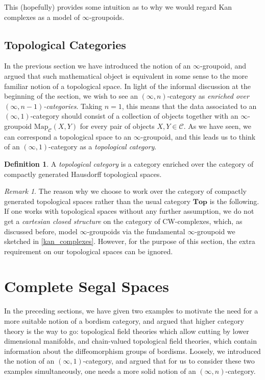 \documentclass[a4paper,11pt]{article}
\newcommand{\ccal}{\mathcal{C}}
\newcommand{\topo}{\mathbf{Top}}
\theoremstyle{plain}
\theoremstyle{definition}
\newtheorem{defi}[thm]{Definition}
\theoremstyle{remark}
\newtheorem*{rem}{Remark}
\begin{document}
This (hopefully) provides some intuition as to why we would regard Kan complexes as a model of $\infty$-groupoids. 

\subsection{Topological Categories}
\label{topological_categories}

In the previous section we have introduced the notion of an $\infty$-groupoid, and argued that such mathematical object is equivalent in some sense to the more familiar notion of a topological space. In light of the informal discussion at the beginning of the section, we wish to see an $(\infty, n)$-category as \textit{enriched over $(\infty, n-1)$-categories}. Taking $n =1$, this means that the data associated to an $(\infty, 1)$-category should consist of a collection of objects together with an $\infty$-groupoid $\text{Map}_{\ccal}(X,Y)$ for every pair of objects $X, Y \in \ccal$. As we have seen, we can correspond a topological space to an $\infty$-groupoid, and this leads us to think of an $(\infty, 1)$-category as a \textit{topological category}. 

\begin{defi}
A \textit{topological category} is a category enriched over the category of compactly generated Hausdorff topological spaces.
\end{defi}

\begin{rem}
The reason why we choose to work over the category of compactly generated topological spaces rather than the usual category $\topo$ is the following. If one works with topological spaces without any further assumption, we do not get a \textit{cartesian closed structure} on the category of CW-complexes, which, as discussed before, model $\infty$-groupoids via the fundamental $\infty$-groupoid we sketched in \ref{kan_complexes}. However, for the purpose of this section, the extra requirement on our topological spaces can be ignored.
\end{rem}

 



\section{Complete Segal Spaces}
\label{complete_sega_spaces}
In the preceding sections, we have given two examples to motivate the need for a more suitable notion of a bordism category, and argued that higher category theory is the way to go: topological field theories which allow cutting by lower dimensional manifolds, and chain-valued topological field theories, which contain information about the diffeomorphism groups of bordisms. Loosely, we introduced the notion of an $(\infty, 1)$-category, and argued that for us to consider these two examples simultaneously, one needs a more solid notion of an $(\infty, n)$-category.
\end{document}
